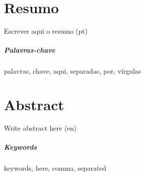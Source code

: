 \chapter*{Resumo}

Escrever aqui o resumo (pt)

\paragraph{Palavras-chave} palavras, chave, aqui, separadas, por, vírgulas

\cleardoublepage

\chapter*{Abstract}

Write abstract here (en)

\paragraph{Keywords} keywords, here, comma, separated

\cleardoublepage
